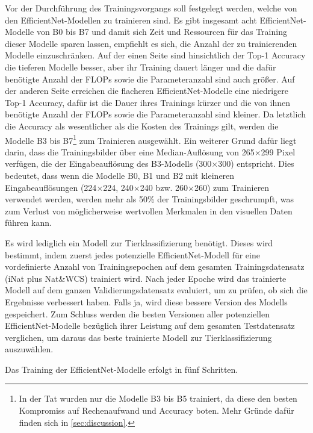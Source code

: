 Vor der Durchführung des Trainingsvorgangs soll festgelegt werden, welche von den EfficientNet-Modellen zu trainieren sind. Es gibt insgesamt acht EfficientNet-Modelle von B0 bis B7 und damit sich Zeit und Ressourcen für das Training dieser Modelle sparen lassen, empfiehlt es sich, die Anzahl der zu trainierenden Modelle einzuschränken. Auf der einen Seite sind hinsichtlich der Top-1 Accuracy die tieferen Modelle besser, aber ihr Training dauert länger und die dafür benötigte Anzahl der FLOPs sowie die Parameteranzahl sind auch größer. Auf der anderen Seite erreichen die flacheren EfficientNet-Modelle eine niedrigere Top-1 Accuracy, dafür ist die Dauer ihres Trainings kürzer und die von ihnen benötigte Anzahl der FLOPs sowie die Parameteranzahl sind kleiner. Da letztlich die Accuracy als wesentlicher als die Kosten des Trainings gilt, werden die Modelle B3 bis B7\footnote{In der Tat wurden nur die Modelle B3 bis B5 trainiert, da diese den besten Kompromiss auf Rechenaufwand und Accuracy boten. Mehr Gründe dafür finden sich in \autoref{sec:discussion}.} zum Trainieren ausgewählt. Ein weiterer Grund dafür liegt darin, dass die Trainingsbilder über eine Median-Auflösung von 265$\times$299 Pixel verfügen, die der Eingabeauflösung des B3-Modells (300$\times$300) entspricht. Dies bedeutet, dass wenn die Modelle B0, B1 und B2 mit kleineren Eingabeauflösungen (224$\times$224, 240$\times$240 bzw. 260$\times$260) zum Trainieren verwendet werden, werden mehr als 50\% der Trainingsbilder geschrumpft, was zum Verlust von möglicherweise wertvollen Merkmalen in den visuellen Daten führen kann.

Es wird lediglich ein Modell zur Tierklassifizierung benötigt. Dieses wird bestimmt, indem zuerst jedes potenzielle EfficientNet-Modell für eine vordefinierte Anzahl von Trainingsepochen auf dem gesamten Trainingsdatensatz (iNat plus Nat\&WCS) trainiert wird. Nach jeder Epoche wird das trainierte Modell auf dem ganzen Validierungsdatensatz evaluiert, um zu prüfen, ob sich die Ergebnisse verbessert haben. Falls ja, wird diese bessere Version des Modells gespeichert. Zum Schluss werden die besten Versionen aller potenziellen EfficientNet-Modelle bezüglich ihrer Leistung auf dem gesamten Testdatensatz verglichen, um daraus das beste trainierte Modell zur Tierklassifizierung auszuwählen.

Das Training der EfficientNet-Modelle erfolgt in fünf Schritten.

